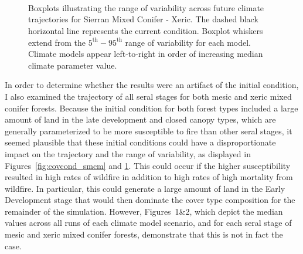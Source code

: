 \begin{figure}[htbp]
 \captionsetup[subfigure]{labelformat=empty}
  \centering
   \\
   \\
       \\
    \caption{Boxplots illustrating the range of variability across future climate trajectories for Sierran Mixed Conifer - Xeric. The dashed black horizontal line represents the current condition. Boxplot whiskers extend from the $5^{\text{th}} - 95^{\text{th}}$ range of variability for each model. Climate models appear left-to-right in order of increasing median climate parameter value.}
  \label{fig:covcond_smcx}
\end{figure} %

In order to determine whether the results were an artifact of the initial condition, I also examined the trajectory of all seral stages for both mesic and xeric mixed conifer forests. Because the initial condition for both forest types included a large amount of land in the late development and closed canopy types, which are generally parameterized to be more susceptible to fire than other seral stages, it seemed plausible that these initial conditions could have a disproportionate impact on the trajectory and the range of variability, as displayed in Figures~\ref{fig:covcond_smcm} and \ref{fig:covcond_smcx}. This could occur if the higher susceptibility resulted in high rates of wildfire in addition to high rates of high mortality from wildfire. In particular, this could generate a large amount of land in the Early Development stage that would then dominate the cover type composition for the remainder of the simulation. However, Figures~1&2, which depict the median values across all runs of each climate model scenario, and for each seral stage of mesic and xeric mixed conifer forests, demonstrate that this is not in fact the case. 

